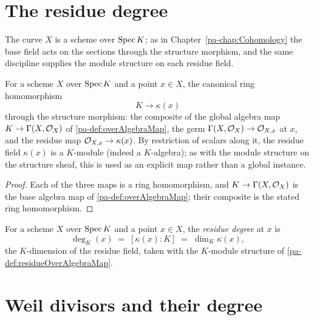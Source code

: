 \section{The residue degree}

The curve \(X\) is a scheme over \(\operatorname{Spec} K\); as in Chapter~\ref{pa-chap:Cohomology} the base field
acts on the sections through the structure morphism, and the same discipline supplies the module
structure on each residue field.

\begin{definition}
  \label{pa-def:residueOverAlgebraMap}
  \leanok

  For a scheme \(X\) over \(\operatorname{Spec} K\) and a point \(x \in X\), the canonical ring homomorphism
  \[
    K \longrightarrow \kappa(x)
  \]
  through the structure morphism: the composite of the global algebra map
  \(K \to \Gamma(X, \mathcal{O}_{X})\) of \ref{pa-def:overAlgebraMap}, the germ
  \(\Gamma(X, \mathcal{O}_{X}) \to \mathcal{O}_{X,x}\) at \(x\), and the residue map
  \(\mathcal{O}_{X,x} \to \kappa(x)\). By restriction of scalars along it, the residue field
  \(\kappa(x)\) is a \(K\)-module (indeed a \(K\)-algebra); as with the module structure on the
  structure sheaf, this is used as an explicit map rather than a global instance.
\end{definition}
\begin{proof}
  \leanok
  Each of the three maps is a ring homomorphism, and \(K \to \Gamma(X, \mathcal{O}_{X})\) is the base
  algebra map of \ref{pa-def:overAlgebraMap}; their composite is the stated ring homomorphism.
\end{proof}

\begin{definition}
  \label{pa-def:residueDeg}
  \leanok

  For a scheme \(X\) over \(\operatorname{Spec} K\) and a point \(x \in X\), the \emph{residue degree} at
  \(x\) is
  \[
    \deg_K(x) \;=\; [\kappa(x) : K] \;=\; \dim_K \kappa(x),
  \]
  the \(K\)-dimension of the residue field, taken with the \(K\)-module structure of
  \ref{pa-def:residueOverAlgebraMap}.
\end{definition}

\section{Weil divisors and their degree}


